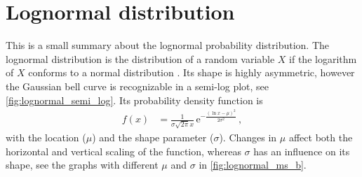 \section{Lognormal distribution}
\label{sec:lognormal_distribution}
This is a small summary about the lognormal probability distribution. The lognormal distribution is the distribution of a random variable $X$ if the logarithm of $X$ conforms to a normal distribution \citep[p.~780]{Bronstein2000}. Its shape is highly asymmetric, however the Gaussian bell curve is recognizable in a semi-log plot, see \autoref{fig:lognormal_semi_log}. Its probability density function is
\begin{align}
	f(x) &= \frac{1}{\sigma \sqrt{2 \pi} x} \, \text{e}^{- \frac{(\ln x - \mu)^2}{2 \sigma^2}}	\,,
\end{align}
with the location ($\mu$) and the shape parameter ($\sigma$). Changes in $\mu$ affect both the horizontal and vertical scaling of the function, whereas $\sigma$ has an influence on its shape, see the graphs with different $\mu$ and $\sigma$ in \autoref{fig:lognormal_ms_b}.
